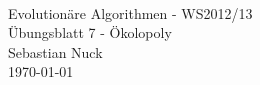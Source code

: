 


\begin{titlepage}
   \mbox{}\vspace{5\baselineskip}\\
   \sffamily\huge
   \centering
   Evolutionäre Algorithmen - WS2012/13
   \vspace{3\baselineskip}\\
   \rmfamily\Large
   Übungsblatt 7 - Ökolopoly
   \vspace{2\baselineskip}\\
   \rmfamily\Large
   Sebastian Nuck
   \vspace{1\baselineskip}\\
   \today
\end{titlepage}


